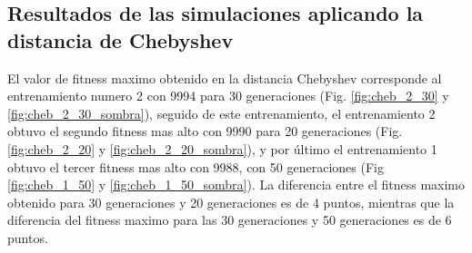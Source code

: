 \documentclass[lettersize, journal]{IEEEtran}
\begin{document}
\subsection{Resultados de las simulaciones aplicando la distancia de Chebyshev}
El valor de fitness maximo obtenido en la distancia Chebyshev corresponde al entrenamiento numero 2 con 9994 para 30 generaciones (Fig. \ref{fig:cheb_2_30} y \ref{fig:cheb_2_30_sombra}), seguido de este entrenamiento, el entrenamiento 2 obtuvo el segundo fitness mas alto con 9990 para 20 generaciones (Fig. \ref{fig:cheb_2_20} y \ref{fig:cheb_2_20_sombra}), y por último el entrenamiento 1 obtuvo el tercer fitness mas alto con 9988, con 50 generaciones (Fig \ref{fig:cheb_1_50} y \ref{fig:cheb_1_50_sombra}).
La diferencia entre el fitness maximo obtenido para 30 generaciones y 20 generaciones es de 4 puntos, mientras que la diferencia del fitness maximo para las 30 generaciones y 50 generaciones es de 6 puntos.




\end{document}
